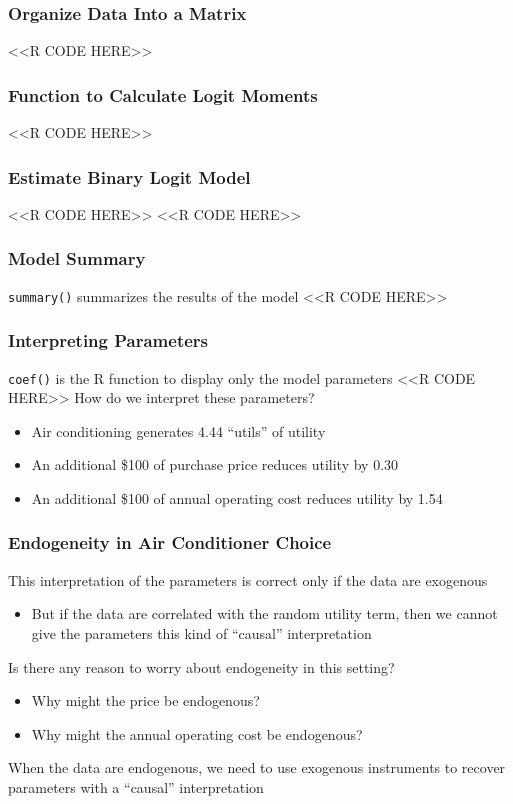 \documentclass{beamer}
\begin{document}
\begin{frame}[fragile]\frametitle{Organize Data Into a Matrix}
    <<R CODE HERE>>
\end{frame}

\begin{frame}[fragile]\frametitle{Function to Calculate Logit Moments}
    <<R CODE HERE>>
\end{frame}

\begin{frame}[fragile]\frametitle{Estimate Binary Logit Model}
    <<R CODE HERE>>
    \vspace{2ex}
    <<R CODE HERE>>
\end{frame}

\begin{frame}[fragile]\frametitle{Model Summary}
    \texttt{summary()} summarizes the results of the model
    \vspace{1ex}
    <<R CODE HERE>>
\end{frame}

\begin{frame}[fragile]\frametitle{Interpreting Parameters}
    \texttt{coef()} is the R function to display only the model parameters
    <<R CODE HERE>>
    \vspace{2ex}
    How do we interpret these parameters?
    \begin{itemize}
        \item Air conditioning generates 4.44 ``utils'' of utility
        \item An additional \$100 of purchase price reduces utility by 0.30
        \item An additional \$100 of annual operating cost reduces utility by 1.54
    \end{itemize}
\end{frame}

\begin{frame}\frametitle{Endogeneity in Air Conditioner Choice}
    This interpretation of the parameters is correct only if the data are exogenous
    \begin{itemize}
    	\item But if the data are correlated with the random utility term, then we cannot give the parameters this kind of ``causal'' interpretation
    \end{itemize}
    \vspace{3ex}
    Is there any reason to worry about endogeneity in this setting?
    \begin{itemize}
    	\item Why might the price be endogenous?
    	\item Why might the annual operating cost be endogenous?
    \end{itemize}
    \vspace{3ex}
    When the data are endogenous, we need to use exogenous instruments to recover parameters with a ``causal'' interpretation
\end{frame}
\end{document}
